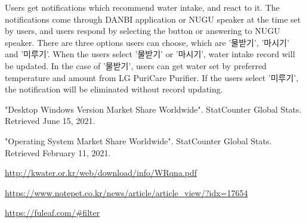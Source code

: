 \documentclass[conference]{IEEEtran}
\begin{document}
\begin{itemize}
Users get notifications which recommend water intake, and react to it. The notifications come through DANBI application or NUGU speaker at the time set by users, and users respond by selecting the button or answering to NUGU speaker. There are three options users can choose, which are '물받기', '마시기' and '미루기'. When the users select '물받기' or '마시기', water intake record will be updated. In the case of '물받기', users can get water set by preferred temperature and amount from LG PuriCare Purifier. If the users select '미루기', the notification will be eliminated without record updating.
\end{itemize}

\begin{thebibliography}{00}
 "Desktop Windows Version Market Share Worldwide". StatCounter Global Stats. Retrieved June 15, 2021.

 "Operating System Market Share Worldwide". StatCounter Global Stats. Retrieved February 11, 2021.

\url{http://kwater.or.kr/web/download/info/WRqna.pdf}

\url{https://www.notepet.co.kr/news/article/article_view/?idx=17654}

\url{https://fuleaf.com/#filter}


\end{thebibliography}
\end{document}
